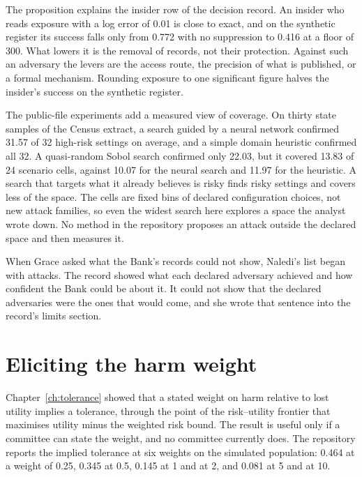 The proposition explains the insider row of the decision record. An insider who reads
exposure with a log error of 0.01 is close to exact, and on the synthetic register its
success falls only from 0.772 with no suppression to 0.416 at a floor of 300.
What lowers it is the removal of records, not their protection. Against such an
adversary the levers are the access route, the precision of what is published, or a
formal mechanism. Rounding exposure to one significant figure halves the insider's
success on the synthetic register. %

The public-file experiments add a measured view of coverage. On thirty state samples
of the Census extract, a search guided by a neural network confirmed 31.57 of 32
high-risk settings on average, and a simple domain heuristic confirmed all 32. A
quasi-random Sobol search confirmed only 22.03, but it covered 13.83 of 24 scenario
cells, against 10.07 for the neural search and 11.97 for the heuristic.
A search that targets what it already believes is risky finds risky settings and
covers less of the space. The cells are fixed bins of declared configuration choices,
not new attack families, so even the widest search here explores a space the analyst
wrote down. No method in the repository proposes an attack outside the declared space
and then measures it.

When Grace asked what the Bank's records could not show, Naledi's list began with
attacks. The record showed what each declared adversary achieved and how confident
the Bank could be about it. It could not show that the declared adversaries were the
ones that would come, and she wrote that sentence into the record's limits section.

\section{Eliciting the harm weight}

Chapter~\ref{ch:tolerance} showed that a stated weight on harm relative to lost
utility implies a tolerance, through the point of the risk--utility frontier that
maximises utility minus the weighted risk bound. The result is useful only if a
committee can state the weight, and no committee currently does. The repository
reports the implied tolerance at six weights on the simulated population: 0.464 at a
weight of 0.25, 0.345 at 0.5, 0.145 at 1 and at 2, and 0.081 at 5 and at 10.

